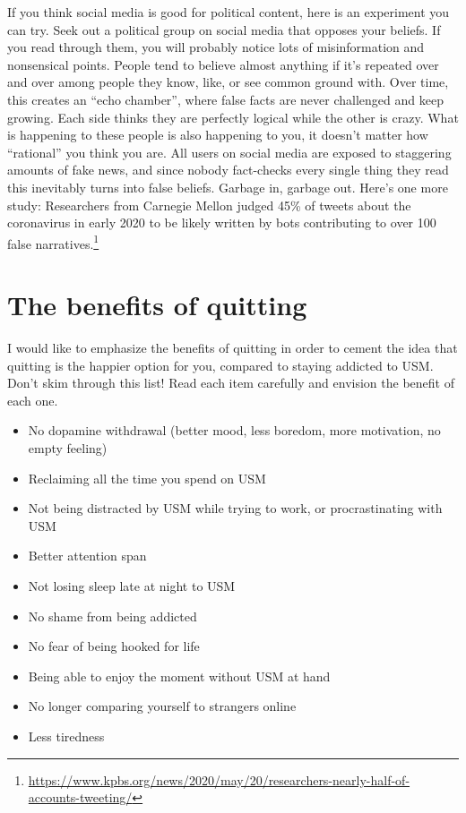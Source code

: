 \documentclass[
  openany]{book}
\providecommand{\tightlist}{%
  \setlength{\itemsep}{0pt}\setlength{\parskip}{0pt}}
\begin{document}
If you think social media is good for political content, here is an experiment you can try. Seek out a political group on social media that opposes your beliefs. If you read through them, you will probably notice lots of misinformation and nonsensical points. People tend to believe almost anything if it's repeated over and over among people they know, like, or see common ground with. Over time, this creates an ``echo chamber'', where false facts are never challenged and keep growing. Each side thinks they are perfectly logical while the other is crazy. What is happening to these people is also happening to you, it doesn't matter how ``rational'' you think you are. All users on social media are exposed to staggering amounts of fake news, and since nobody fact-checks every single thing they read this inevitably turns into false beliefs. Garbage in, garbage out. Here's one more study: Researchers from Carnegie Mellon judged 45\% of tweets about the coronavirus in early 2020 to be likely written by bots contributing to over 100 false narratives.\footnote{\url{https://www.kpbs.org/news/2020/may/20/researchers-nearly-half-of-accounts-tweeting/}}

\section{The benefits of quitting}\label{the-benefits-of-quitting}

I would like to emphasize the benefits of quitting in order to cement the idea that quitting is the happier option for you, compared to staying addicted to USM. Don't skim through this list! Read each item carefully and envision the benefit of each one.

\begin{itemize}
\tightlist
\item
  No dopamine withdrawal (better mood, less boredom, more motivation, no empty feeling)
\item
  Reclaiming all the time you spend on USM
\item
  Not being distracted by USM while trying to work, or procrastinating with USM
\item
  Better attention span
\item
  Not losing sleep late at night to USM
\item
  No shame from being addicted
\item
  No fear of being hooked for life
\item
  Being able to enjoy the moment without USM at hand
\item
  No longer comparing yourself to strangers online
\item
  Less tiredness
\end{itemize}
\end{document}
